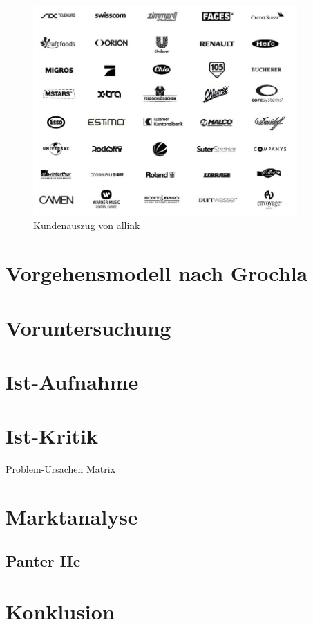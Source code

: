 \begin{figure}[htbp]
\begin{center}
\includegraphics[width=0.9\textwidth,angle=0]{./bilder/kundenauszug.jpg}
\caption{Kundenauszug von allink}
\label{pic:kundenauszug}
\end{center}
\end{figure}


\section{Vorgehensmodell nach Grochla}


\section{Voruntersuchung}


\section{Ist-Aufnahme}


\section{Ist-Kritik}
Problem-Ursachen Matrix

\section{Marktanalyse}
\subsection{Panter IIc}

\section{Konklusion}
